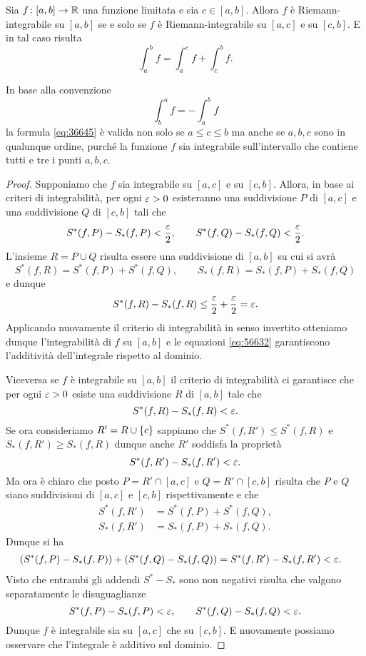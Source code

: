 \begin{theorem}
\mymark{*}%
%
%
%
\label{th:additivita_integrale}%
Sia $f\colon [a,b]\to {\mathbb R}$ una funzione limitata e sia $c\in [a,b]$.
Allora $f$ è Riemann-integrabile su $[a,b]$ se e solo se
$f$ è Riemann-integrabile su $[a,c]$ e su $[c,b]$.
E in tal caso risulta
\begin{equation}\label{eq:36645}
  \int_a^b f = \int_a^c f + \int_c^b f.
\end{equation}

In base alla convenzione
\[
    \int_b^a f = -\int_a^b f
\]
la formula \eqref{eq:36645} è valida non solo se $a\le c\le b$ ma anche
se $a,b,c$ sono in qualunque ordine, purché la funzione $f$ sia integrabile
sull'intervallo che contiene tutti e tre i punti $a,b,c$.
\end{theorem}
%
\begin{proof}
\mymark{*}
Supponiamo che $f$ sia integrabile su $[a,c]$ e su $[c,b]$.
Allora, in base ai criteri di integrabilità, per ogni $\varepsilon>0$ esisteranno una
suddivisione $P$ di $[a,c]$ e una suddivisione $Q$ di $[c,b]$ tali che
\[
  S^*(f,P) - S_*(f,P) < \frac {\varepsilon} 2,
  \qquad
  S^*(f,Q) - S_*(f,Q) < \frac {\varepsilon} 2.
\]
L'insieme $R=P\cup Q$ risulta essere una suddivisione di $[a,b]$ su cui si avrà
\begin{equation}\label{eq:56632}
S^*(f,R) = S^*(f,P) + S^*(f,Q), \qquad
S_*(f,R) = S_*(f,P) + S_*(f,Q)
\end{equation}
e dunque
\[
S^*(f,R) - S_*(f,R) \le \frac {\varepsilon} 2 + \frac {\varepsilon} 2 = \varepsilon.
\]
Applicando nuovamente il criterio di integrabilità in senso invertito otteniamo
dunque l'integrabilità di $f$ su $[a,b]$ e le equazioni
\eqref{eq:56632} garantiscono l'additività dell'integrale rispetto al dominio.

Viceversa se $f$ è integrabile su $[a,b]$ il criterio di integrabilità
ci garantisce che per ogni $\varepsilon>0$ esiste una suddivisione $R$ di $[a,b]$ tale che
\[
S^*(f,R) - S_*(f,R) < \varepsilon.
\]
Se ora consideriamo $R' = R \cup {\left\{ c \right\}}$ sappiamo che $S^*(f,R') \le S^*(f,R)$
e $S_*(f,R') \ge S_*(f,R)$ dunque anche $R'$ soddisfa la proprietà
\[
S^*(f,R') - S_*(f,R') < \varepsilon.
\]
Ma ora è chiaro che posto $P=R'\cap[a,c]$ e $Q=R'\cap[c,b]$ risulta che $P$
e $Q$ siano suddivisioni di $[a,c]$ e $[c,b]$ rispettivamente e che
\begin{align*}
  S^*(f,R') &= S^*(f,P) + S^*(f,Q), \\
  S_*(f,R') &= S_*(f,P) + S_*(f,Q).
\end{align*}
Dunque si ha
\begin{align*}
(S^*(f,P) - S_*(f,P)) + (S^*(f,Q) - S_*(f,Q))
&= S^*(f,R') - S_*(f,R')
< \varepsilon.
\end{align*}
Visto che entrambi gli addendi $S^*-S_*$ sono non negativi
risulta che valgono separatamente le disuguaglianze
\[
S^*(f,P) - S_*(f,P) < \varepsilon, \qquad
S^*(f,Q) - S_*(f,Q) < \varepsilon.
\]
Dunque $f$ è integrabile sia su $[a,c]$ che su $[c,b]$.
E nuovamente possiamo osservare che l'integrale è additivo sul dominio.
\end{proof}  

